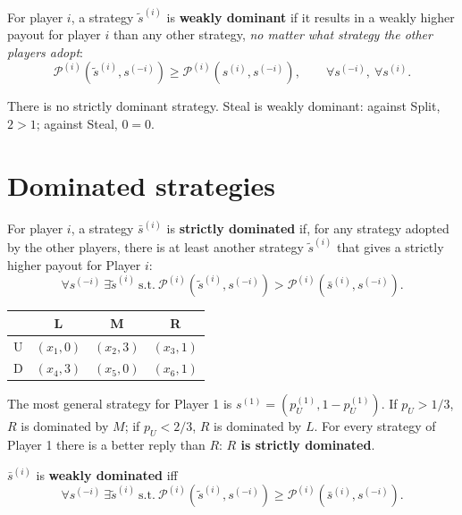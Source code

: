 \documentclass[11pt,a4paper,openany]{book}
\begin{document}
\begin{defnbox}[title=Weakly dominant strategy]
For player $i$, a strategy $\tilde{s}^{(i)}$ is \textbf{weakly dominant} if it results in a
weakly higher payout for player $i$ than any other strategy, \emph{no matter what strategy
the other players adopt}:
\[
\mathcal{P}^{(i)}(\tilde{s}^{(i)}, s^{(-i)}) \ge \mathcal{P}^{(i)}(s^{(i)}, s^{(-i)}),
\qquad \forall s^{(-i)}, \ \forall s^{(i)}.
\]
\end{defnbox}

\begin{exbox}[title=Split or Steal]
There is no strictly dominant strategy. Steal is weakly dominant: against Split, $2 > 1$;
against Steal, $0 = 0$.
\end{exbox}


\section{Dominated strategies}

\begin{defnbox}[title=Strictly dominated strategy]
For player $i$, a strategy $\bar{s}^{(i)}$ is \textbf{strictly dominated} if, for any
strategy adopted by the other players, there is at least another strategy $\tilde{s}^{(i)}$
that gives a strictly higher payout for Player $i$:
\[
\forall s^{(-i)} \ \exists \tilde{s}^{(i)} \ \text{s.t.} \
\mathcal{P}^{(i)}(\tilde{s}^{(i)}, s^{(-i)}) > \mathcal{P}^{(i)}(\bar{s}^{(i)}, s^{(-i)}).
\]
\end{defnbox}

\begin{exbox}[title={Example 1: $R$ is strictly dominated}]
\begin{center}
\begin{tabular}{c|ccc}
 & L & M & R \\ \hline
U & $(x_1,0)$ & $(x_2,3)$ & $(x_3,1)$ \\
D & $(x_4,3)$ & $(x_5,0)$ & $(x_6,1)$
\end{tabular}
\end{center}
The most general strategy for Player 1 is $s^{(1)} = (p_U^{(1)}, 1 - p_U^{(1)})$. If
$p_U > 1/3$, $R$ is dominated by $M$; if $p_U < 2/3$, $R$ is dominated by $L$. For every
strategy of Player 1 there is a better reply than $R$: \textbf{$R$ is strictly dominated}.
\end{exbox}


\begin{defnbox}[title=Weakly dominated strategy]
$\bar{s}^{(i)}$ is \textbf{weakly dominated} iff
\[
\forall s^{(-i)} \ \exists \tilde{s}^{(i)} \ \text{s.t.} \
\mathcal{P}^{(i)}(\tilde{s}^{(i)}, s^{(-i)}) \ge \mathcal{P}^{(i)}(\bar{s}^{(i)}, s^{(-i)}).
\]
\end{defnbox}
\end{document}
